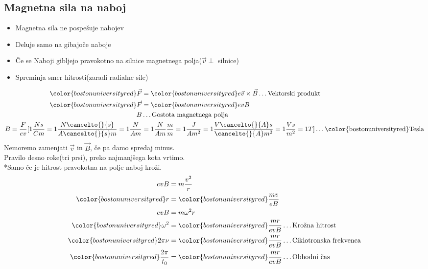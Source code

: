 {\color{indiagreen}\subsection{Magnetna sila na naboj}}
\begin{itemize}
	\item Magnetna sila ne pospešuje nabojev
	\item Deluje samo na gibajoče naboje
	\item Če se Naboji gibljejo pravokotno na silnice magnetnega polja($\vec{v} \perp$ silnice)
	\item Spreminja smer hitrosti(zaradi radialne sile)
\end{itemize}
\begin{align*}
	{\color{bostonuniversityred}\vec{F}} &= {\color{bostonuniversityred}e \vec{v} \times \vec{B}} \dots \text{Vektorski produkt}\\
	{\color{bostonuniversityred}\vec{F}} &= {\color{bostonuniversityred}evB}\\
	B &\dots \text{Gostota magnetnega polja}\\
	B = \frac{F}{ev}[1\frac{Ns}{Cm} = 1\frac{N\cancelto{}{s}}{A\cancelto{}{s}m} = 1\frac{N}{Am} &= 1 \frac{N}{Am}\frac{m}{m} = 1\frac{J}{Am^2} = 1\frac{V\cancelto{}{A}s}{\cancelto{}{A}m^2} = 1\frac{Vs}{m^2} = 1T] \dots \text{{\color{bostonuniversityred}Tesla}}\\
\end{align*}
Nemoremo zamenjati $\vec{v}$ in $\vec{B}$, če pa damo spredaj minus.\\
Pravilo desno roke(tri prsi), preko najmanjšega kota vrtimo.\\
*Samo če je hitrost pravokotna na polje naboj kroži.\\
\begin{align*}
	evB &= m\frac{v^2}{r}\\
	{\color{bostonuniversityred}r} &= {\color{bostonuniversityred}\frac{mv}{eB}}\\
	evB &= m \omega^2 r\\
	{\color{bostonuniversityred}\omega^2} &= {\color{bostonuniversityred}\frac{mr}{evB}} \dots \text{Krožna hitrost}\\
	{\color{bostonuniversityred}2\pi \nu} &= {\color{bostonuniversityred}\frac{mr}{evB}} \dots \text{Ciklotronska frekvenca}\\
	{\color{bostonuniversityred}\frac{2\pi}{t_0}} &= {\color{bostonuniversityred}\frac{mr}{evB}} \dots \text{Obhodni čas}\\
\end{align*}
